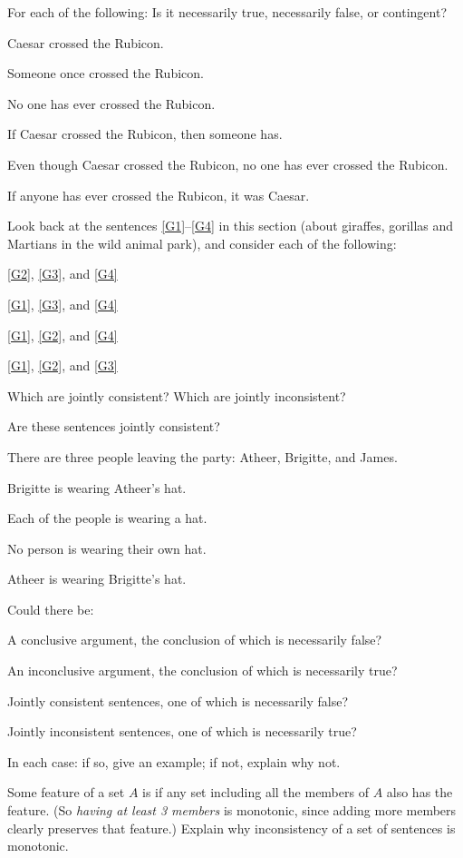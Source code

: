 \problempart
\label{pr.EnglishTautology}
For each of the following: Is it necessarily true, necessarily false, or contingent?
\begin{earg}
\item Caesar crossed the Rubicon.
\item Someone once crossed the Rubicon.
\item No one has ever crossed the Rubicon.
\item If Caesar crossed the Rubicon, then someone has.
\item Even though Caesar crossed the Rubicon, no one has ever crossed the Rubicon.
\item If anyone has ever crossed the Rubicon, it was Caesar.
\end{earg}

\problempart
\label{pr.MartianGiraffes}
Look back at the sentences \ref{G1}–\ref{G4} in this section (about giraffes, gorillas and Martians in the wild animal park), and consider each of the following:
\begin{earg}
\item \ref{G2}, \ref{G3}, and \ref{G4}
\item \ref{G1}, \ref{G3}, and \ref{G4}
\item \ref{G1}, \ref{G2}, and \ref{G4}
\item \ref{G1}, \ref{G2}, and \ref{G3}
\end{earg}
Which are jointly consistent? Which are jointly inconsistent? 

\problempart Are these sentences jointly consistent?
\begin{earg}
\item There are three people leaving the party: Atheer, Brigitte, and James.
\item Brigitte is wearing Atheer's hat.
\item Each of the people is wearing a hat.
\item No person is wearing their own hat.
\item Atheer is wearing Brigitte's hat.
\end{earg}



\problempart
\label{pr.ModalityValidity}
Could there be:
\begin{earg}
\item A conclusive argument, the conclusion of which is necessarily false?
\item An inconclusive argument, the conclusion of which is necessarily true?
\item Jointly consistent sentences, one of which is necessarily false?
\item Jointly inconsistent sentences, one of which is necessarily true?
\end{earg}
In each case: if so, give an example; if not, explain why not.

\problempart Some feature of a set $A$ is  if any set including all the members of $A$ also has the feature. (So \emph{having at least 3 members} is monotonic, since adding more members clearly preserves that feature.) Explain why inconsistency of a set of sentences is monotonic.
